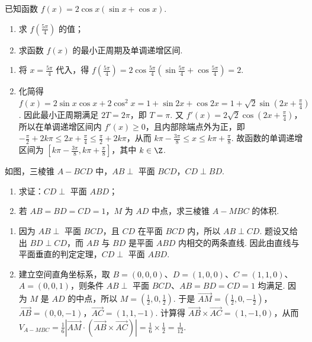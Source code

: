 \begin{problem}
已知函数 \( f(x) = 2\cos x (\sin x + \cos x) \).

\begin{enumerate}
\item 求 \( f\left(\frac{5\pi}{4}\right) \) 的值；
\item 求函数 \( f(x) \) 的最小正周期及单调递增区间.
\end{enumerate}

\begin{solution}
\begin{enumerate}
\item 将 \(x=\frac{5\pi}{4}\) 代入，得 \(f\left(\frac{5\pi}{4}\right)=2\cos\frac{5\pi}{4}\left(\sin\frac{5\pi}{4}+\cos\frac{5\pi}{4}\right)=2\).
\item 化简得 \(f(x)=2\sin x\cos x+2\cos^2x=1+\sin2x+\cos2x=1+\sqrt2\sin\left(2x+\frac\pi4\right)\). 因此最小正周期满足 \(2T=2\pi\)，即 \(T=\pi\). 又 \(f'(x)=2\sqrt2\cos\left(2x+\frac\pi4\right)\)，所以在单调递增区间内 \(f'(x)\geqslant0\)，且内部除端点外为正，即 \(-\frac\pi2+2k\pi\leqslant2x+\frac\pi4\leqslant\frac\pi2+2k\pi\)，从而 \(k\pi-\frac{3\pi}{8}\leqslant x\leqslant k\pi+\frac\pi8\). 故函数的单调递增区间为 \(\left[k\pi-\frac{3\pi}{8},k\pi+\frac\pi8\right]\)，其中 \(k\in\Z\).
\end{enumerate}
\end{solution}
\end{problem}

\begin{problem}
如图，三棱锥 \(A - BCD\) 中，\(AB \perp\) 平面 \(BCD\)，\(CD \perp BD\).

\begin{enumerate}
\item 求证：\(CD \perp\) 平面 \(ABD\)；
\item 若 \(AB = BD = CD = 1\)，\(M\) 为 \(AD\) 中点，求三棱锥 \(A - MBC\) 的体积.
\end{enumerate}


\begin{solution}
\begin{enumerate}
\item 因为 \(AB\perp\) 平面 \(BCD\)，且 \(CD\) 在平面 \(BCD\) 内，所以 \(AB\perp CD\). 题设又给出 \(BD\perp CD\)，而 \(AB\) 与 \(BD\) 是平面 \(ABD\) 内相交的两条直线. 因此由直线与平面垂直的判定定理，\(CD\perp\) 平面 \(ABD\).
\item 建立空间直角坐标系，取 \(B=(0,0,0)\)、\(D=(1,0,0)\)、\(C=(1,1,0)\)、\(A=(0,0,1)\)，则条件 \(AB\perp\) 平面 \(BCD\)、\(AB=BD=CD=1\) 均满足. 因为 \(M\) 是 \(AD\) 的中点，所以 \(M=\left(\frac12,0,\frac12\right)\). 于是 \(\overrightarrow{AM}=\left(\frac12,0,-\frac12\right)\)，\(\overrightarrow{AB}=(0,0,-1)\)，\(\overrightarrow{AC}=(1,1,-1)\). 计算得 \(\overrightarrow{AB}\times\overrightarrow{AC}=(1,-1,0)\)，从而 \(V_{A-MBC}=\frac16\left|\overrightarrow{AM}\cdot\left(\overrightarrow{AB}\times\overrightarrow{AC}\right)\right|=\frac16\times\frac12=\frac1{12}\).
\end{enumerate}
\end{solution}
\end{problem}

